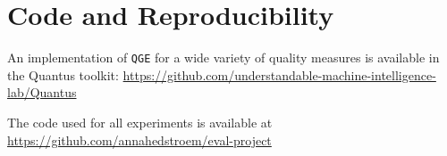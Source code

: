
\section{Code and Reproducibility}
An implementation of \texttt{QGE} for a wide variety of quality measures is available in the Quantus toolkit: \url{https://github.com/understandable-machine-intelligence-lab/Quantus}

The code used for all experiments is available at \url{https://github.com/annahedstroem/eval-project}